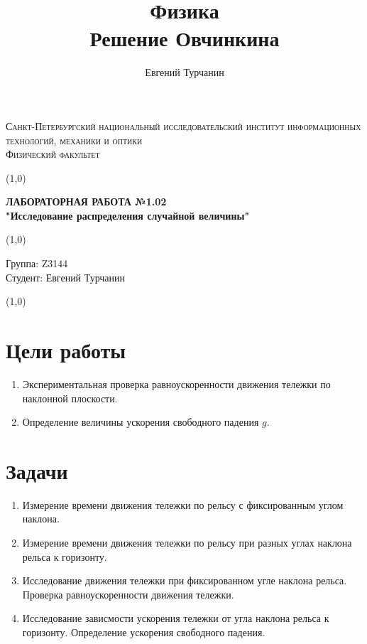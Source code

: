 \documentclass[a4paper]{article}
\title{\Huge{Физика}\\ Решение Овчинкина}
\author{\huge{Евгений Турчанин}}
\date{}
\begin{document}
\begin{center}
\textsc{Санкт-Петербургский национальный исследовательский институт информационных технологий, механики и оптики\\[3mm]
Физический факультет} \\[3mm]

\end{center}
\vspace{5mm}
\line(1,0){\textwidth}
\begin{center}
\textbf{ЛАБОРАТОРНАЯ РАБОТА №1.02\\}
\textbf{"Исследование распределения случайной величины"}
\end{center}
\vspace{2mm}
\line(1,0){\textwidth}
\vspace{5mm}
\begin{minipage}{0.4\textwidth}
    Группа: Z3144 \\
    Студент: Евгений Турчанин\\
    \vspace{1mm}
\end{minipage}
\hfill
\vspace{1mm}
\line(1,0){\textwidth}


\section{Цели работы}
\begin{enumerate}
	\item Экспериментальная проверка равноускоренности движения тележки по наклонной плоскости.
	\item Определение величины ускорения свободного падения $g$.
\end{enumerate}


\section{Задачи}
\begin{enumerate}
	\item Измерение времени движения тележки по рельсу с фиксированным углом наклона.

	\item Измерение времени движения тележки по рельсу при разных углах наклона рельса к горизонту.

	\item Исследование движения тележки при фиксированном угле наклона рельса. Проверка равноускоренности движения тележки.
	
	\item Исследование зависмости ускорения тележки от угла наклона рельса к горизонту. Определение ускорения свободного падения.
\end{enumerate}
\end{document}
